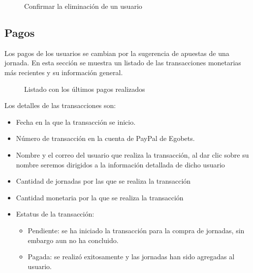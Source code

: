 \begin{figure}[!htb]\centering
   \begin {minipage}{0.5\textwidth}
     \caption[Confirmar la eliminación de un usuario]{Confirmar la eliminación de un usuario\footnotemark}
	 \label{Fig:Eliminar-usuario}
   \end{minipage}
\end{figure}


\subsection{Pagos}
Los pagos de los usuarios se cambian por la sugerencia de apuestas de una jornada. En esta sección se muestra un listado de las transacciones monetarias más recientes y su información general.

\begin{figure}[!htb]\centering
   \begin {minipage}{1\textwidth}
     \caption{Listado con los últimos pagos realizados}
	 \label{Fig:Transacciones}
   \end{minipage}
\end{figure}

Los detalles de las transacciones son:
\begin{itemize}
	\item Fecha en la que la transacción se inicio.
	\item Número de transacción en la cuenta de PayPal de Egobets.
	\item Nombre y el correo del usuario que realiza la transacción, al dar clic sobre su nombre seremos dirigidos a la información detallada de dicho usuario
	\item Cantidad de jornadas por las que se realiza la transacción
	\item Cantidad monetaria por la que se realiza la transacción
	\item Estatus de la transacción:
	\begin{itemize}
		\item Pendiente: se ha iniciado la transacción para la compra de jornadas, sin embargo aun no ha concluido.
		\item Pagada: se realizó exitosamente y las jornadas han sido agregadas al usuario.
	\end{itemize}
\end{itemize}

